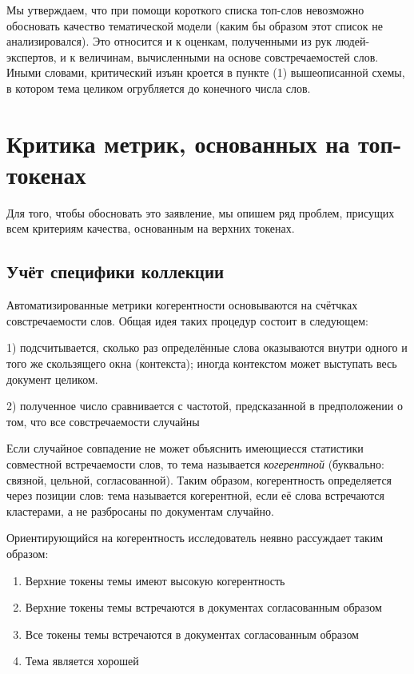 Мы утверждаем, что при помощи короткого списка топ-слов невозможно обосновать качество тематической модели (каким бы образом этот список не анализировался). Это относится и к оценкам, полученными из рук людей-экспертов, и к величинам, вычисленными на основе совстречаемостей слов. Иными словами, критический изъян кроется в пункте (1) вышеописанной схемы, в котором тема целиком огрубляется до конечного числа слов.

\section{Критика метрик, основанных на топ-токенах}


Для того, чтобы обосновать это заявление, мы опишем ряд проблем, присущих всем критериям качества, основанным на верхних токенах.

\subsection{Учёт специфики коллекции}

Автоматизированные метрики когерентности основываются на счётчках совстречаемости слов. Общая идея таких процедур состоит в следующем: 

1) подсчитывается, сколько раз определённые слова оказываются внутри одного и того же скользящего окна (контекста); иногда контекстом может выступать весь документ целиком.

2) полученное число сравнивается с частотой, предсказанной в предположении о том, что все совстречаемости случайны

Если случайное совпадение не может объяснить имеющиесся статистики совместной встречаемости слов, то тема называется \textit{когерентной} (буквально: связной, цельной, согласованной). Таким образом, когерентность определяется через позиции слов: тема называется когерентной, если её слова встречаются кластерами, а не разбросаны по документам случайно.

Ориентирующийся на когерентность исследователь неявно рассуждает таким образом: 
\begin{enumerate}
    \item Верхние токены темы имеют высокую когерентность
    \item Верхние токены темы встречаются в документах согласованным образом
    \item Все токены темы встречаются в документах согласованным образом
    \item Тема является хорошей
\end{enumerate}

